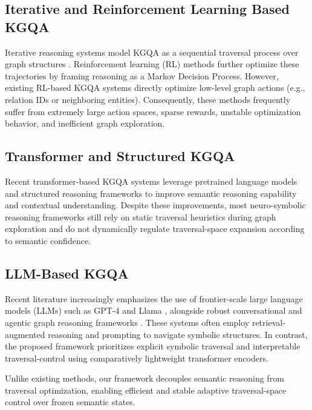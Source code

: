 \documentclass[10pt,conference]{IEEEtran}
\begin{document}
\subsection{Iterative and Reinforcement Learning Based KGQA}
Iterative reasoning systems model KGQA as a sequential traversal process over graph structures \cite{xiong2017deeppath, das2017go, lin2018multi, sun2018open, xian2019reinforcement, sun2019pullnet, wang2020reasoning}. Reinforcement learning (RL) methods further optimize these trajectories by framing reasoning as a Markov Decision Process. However, existing RL-based KGQA systems directly optimize low-level graph actions (e.g., relation IDs or neighboring entities). Consequently, these methods frequently suffer from extremely large action spaces, sparse rewards, unstable optimization behavior, and inefficient graph exploration.

\subsection{Transformer and Structured KGQA}
Recent transformer-based KGQA systems leverage pretrained language models and structured reasoning frameworks \cite{liu2019roberta, jiang2023structgpt, wang2023knowledgpt, luo2024reasoning} to improve semantic reasoning capability and contextual understanding. Despite these improvements, most neuro-symbolic reasoning frameworks still rely on static traversal heuristics during graph exploration and do not dynamically regulate traversal-space expansion according to semantic confidence.

\subsection{LLM-Based KGQA}
Recent literature increasingly emphasizes the use of frontier-scale large language models (LLMs) such as GPT-4 \cite{achiam2023gpt} and Llama \cite{touvron2023llama}, alongside robust conversational and agentic graph reasoning frameworks \cite{christmann2024reign, chen2024spinach, chen2025drkg, zhao2025enrich}. These systems often employ retrieval-augmented reasoning and prompting to navigate symbolic structures. In contrast, the proposed framework prioritizes explicit symbolic traversal and interpretable traversal-control using comparatively lightweight transformer encoders.

Unlike existing methods, our framework decouples semantic reasoning from traversal optimization, enabling efficient and stable adaptive traversal-space control over frozen semantic states.
\end{document}

